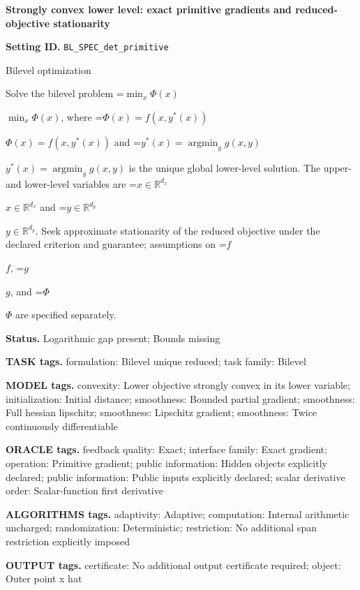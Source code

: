 \documentclass[10pt,a4paper]{article}
\newcommand{\AtlasMath}[1]{\par\begingroup\centering\setbox0=\hbox{$\displaystyle #1$}\ifdim\wd0>1.4\linewidth\typeout{ATLAS WIDE FORMULA: \the\wd0}\fi\ifdim\wd0>\linewidth\resizebox{\linewidth}{!}{\box0}\else\box0\fi\par\endgroup}
\newcommand{\AtlasInlineMath}[1]{\begingroup\setbox0=\hbox{$#1$}\ifdim\wd0>.4\linewidth\endgroup\AtlasMath{#1}\else\endgroup$#1$\fi}
\begin{document}
\raggedright

{\LARGE\bfseries\sffamily\color{AtlasNavy} Strongly convex lower level: exact primitive gradients and reduced-objective stationarity\par}\vspace{5pt}


\textbf{Setting ID.} \texttt{BL\_\allowbreak{}SPEC\_\allowbreak{}det\_\allowbreak{}primitive}



Bilevel optimization



Solve the bilevel problem \AtlasInlineMath{\min_x\Phi(x)}, where \AtlasInlineMath{\Phi(x)=f(x,y^*(x))} and \AtlasInlineMath{y^*(x)=\operatorname*{argmin}_y g(x,y)} is the unique global lower-level solution. The upper- and lower-level variables are \AtlasInlineMath{x\in\mathbb{R}^{d_x}} and \AtlasInlineMath{y\in\mathbb{R}^{d_y}}. Seek approximate stationarity of the reduced objective under the declared criterion and guarantee; assumptions on \AtlasInlineMath{f}, \AtlasInlineMath{g}, and \AtlasInlineMath{\Phi} are specified separately.



\textbf{Status.} Logarithmic gap present; Bounds missing



\textbf{TASK tags.} formulation: Bilevel unique reduced; task family: Bilevel



\textbf{MODEL tags.} convexity: Lower objective strongly convex in its lower variable; initialization: Initial distance; smoothness: Bounded partial gradient; smoothness: Full hessian lipschitz; smoothness: Lipschitz gradient; smoothness: Twice continuously differentiable



\textbf{ORACLE tags.} feedback quality: Exact; interface family: Exact gradient; operation: Primitive gradient; public information: Hidden objects explicitly declared; public information: Public inputs explicitly declared; scalar derivative order: Scalar-function first derivative



\textbf{ALGORITHMS tags.} adaptivity: Adaptive; computation: Internal arithmetic uncharged; randomization: Deterministic; restriction: No additional span restriction explicitly imposed



\textbf{OUTPUT tags.} certificate: No additional output certificate required; object: Outer point x hat
\end{document}

